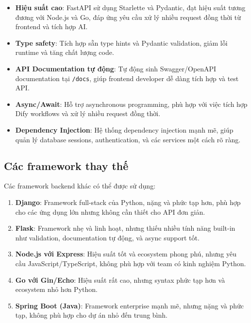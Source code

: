 \documentclass[../DoAn.tex]{subfiles}
\begin{document}
\begin{itemize}
    \item \textbf{Hiệu suất cao}: FastAPI sử dụng Starlette và Pydantic, đạt hiệu suất tương đương với Node.js và Go, đáp ứng yêu cầu xử lý nhiều request đồng thời từ frontend và tích hợp AI.
    
    \item \textbf{Type safety}: Tích hợp sẵn type hints và Pydantic validation, giảm lỗi runtime và tăng chất lượng code.
    
    \item \textbf{API Documentation tự động}: Tự động sinh Swagger/OpenAPI documentation tại \texttt{/docs}, giúp frontend developer dễ dàng tích hợp và test API.
    
    \item \textbf{Async/Await}: Hỗ trợ asynchronous programming, phù hợp với việc tích hợp Dify workflows và xử lý nhiều request đồng thời.
    
    \item \textbf{Dependency Injection}: Hệ thống dependency injection mạnh mẽ, giúp quản lý database sessions, authentication, và các services một cách rõ ràng.
\end{itemize}

\subsection{Các framework thay thế}

Các framework backend khác có thể được sử dụng:

\begin{enumerate}
    \item \textbf{Django}: Framework full-stack của Python, nặng và phức tạp hơn, phù hợp cho các ứng dụng lớn nhưng không cần thiết cho API đơn giản.
    
    \item \textbf{Flask}: Framework nhẹ và linh hoạt, nhưng thiếu nhiều tính năng built-in như validation, documentation tự động, và async support tốt.
    
    \item \textbf{Node.js với Express}: Hiệu suất tốt và ecosystem phong phú, nhưng yêu cầu JavaScript/TypeScript, không phù hợp với team có kinh nghiệm Python.
    
    \item \textbf{Go với Gin/Echo}: Hiệu suất rất cao, nhưng syntax phức tạp hơn và ecosystem nhỏ hơn Python.
    
    \item \textbf{Spring Boot (Java)}: Framework enterprise mạnh mẽ, nhưng nặng và phức tạp, không phù hợp cho dự án nhỏ đến trung bình.
\end{enumerate}
\end{document}
